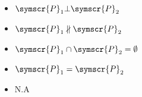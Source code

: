\documentclass{article}
\def\fancyP{\symscr{P}}
\begin{document}
\begin{enumerate}
\begin{itemize}
            \begin{itemize}
                \item \(\fancyP_1 \bot \fancyP_2\)
                \item \(\fancyP_1 \nparallel \fancyP_2\)
                \item \(\fancyP_1 \cap \fancyP_2 = \emptyset\)
                \item \(\fancyP_1 = \fancyP_2\)
                \item N.A
            \end{itemize}
    \end{itemize}
\end{enumerate}
\end{document}
